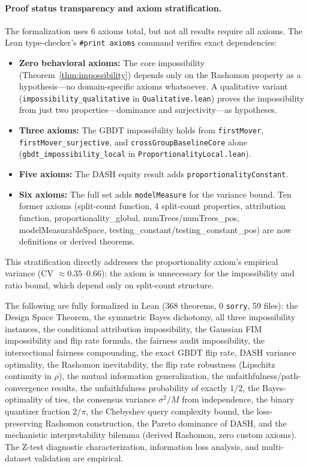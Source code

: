 \documentclass{article}
\begin{document}
\paragraph{Proof status transparency and axiom stratification.}
\begin{sloppypar}
The formalization uses 6 axioms total,
but not all results require all axioms. The Lean type-checker's
\texttt{\#print axioms} command verifies exact dependencies:
\begin{itemize}
\item \textbf{Zero behavioral axioms:} The core impossibility
(Theorem~\ref{thm:impossibility}) depends only on the Rashomon property as a
hypothesis---no domain-specific axioms whatsoever. A qualitative variant
(\texttt{impossibility\allowbreak\_qualitative} in \texttt{Qualitative.lean}) proves
the impossibility from just two properties---dominance and surjectivity---as
hypotheses.
\item \textbf{Three axioms:} The GBDT impossibility holds from \texttt{firstMover}, \texttt{firstMover\_surjective}, and \texttt{crossGroupBaselineCore} alone (\texttt{gbdt\allowbreak\_impossibility\allowbreak\_local} in \texttt{Proportionality\allowbreak Local.lean}).
\item \textbf{Five axioms:} The DASH equity result adds \texttt{proportionalityConstant}.
\item \textbf{Six axioms:} The full set adds \texttt{modelMeasure} for the variance bound. Ten former axioms (split-count function, 4 split-count properties, attribution function, proportionality\_global, numTrees/numTrees\_pos, modelMeasurableSpace, testing\_constant/testing\_constant\_pos) are now definitions or derived theorems.
\end{itemize}
\end{sloppypar}
This stratification directly addresses the proportionality axiom's empirical variance (CV $\approx 0.35$--$0.66$): the axiom is unnecessary for the impossibility and ratio bound, which depend only on split-count structure.

The following are fully formalized in Lean (368 theorems, 0 \texttt{sorry}, 59 files): the Design Space Theorem, the symmetric Bayes dichotomy, all three impossibility instances, the conditional attribution impossibility, the Gaussian FIM impossibility and flip rate formula, the fairness audit impossibility, the intersectional fairness compounding, the exact GBDT flip rate, DASH variance optimality, the Rashomon inevitability, the flip rate robustness (Lipschitz continuity in $\rho$), the mutual information generalization, the unfaithfulness/path-convergence results, the unfaithfulness probability of exactly $1/2$, the Bayes-optimality of ties, the consensus variance $\sigma^2/M$ from independence, the binary quantizer fraction $2/\pi$, the Chebyshev query complexity bound, the loss-preserving Rashomon construction, the Pareto dominance of DASH, and the mechanistic interpretability bilemma (derived Rashomon, zero custom axioms). The Z-test diagnostic characterization, information loss analysis, and multi-dataset validation are empirical.
\end{document}
